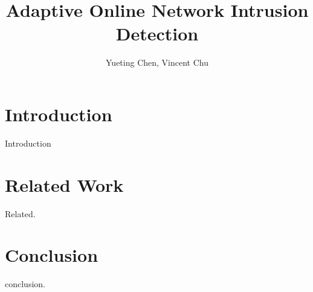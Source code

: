 \documentclass[runningheads]{llncs}
\begin{document}
	
	\title{Adaptive Online Network Intrusion Detection}
	
	\author{Yueting Chen, Vincent Chu}
	
	
	\maketitle
	
	{\tiny }
	\begin{abstract} \label{abstract}
		
		
	\end{abstract}
	

\section{Introduction} \label{introduction}

Introduction

\section{Related Work} \label{related work}

Related.

\section{Conclusion} \label{conclusion}
conclusion. 



  
\end{document}

